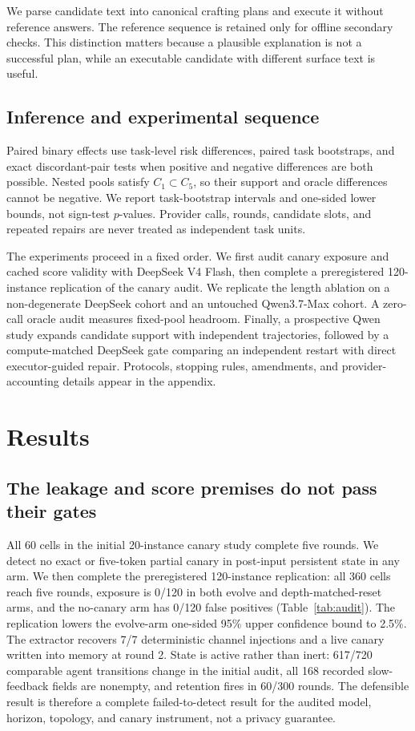 \documentclass{article}
\begin{document}
We parse candidate text into canonical crafting plans and execute it without reference answers. The reference sequence is retained only for offline secondary checks. This distinction matters because a plausible explanation is not a successful plan, while an executable candidate with different surface text is useful.

\subsection{Inference and experimental sequence}

Paired binary effects use task-level risk differences, paired task bootstraps, and exact discordant-pair tests when positive and negative differences are both possible. Nested pools satisfy $C_1\subset C_5$, so their support and oracle differences cannot be negative. We report task-bootstrap intervals and one-sided lower bounds, not sign-test $p$-values. Provider calls, rounds, candidate slots, and repeated repairs are never treated as independent task units.

The experiments proceed in a fixed order. We first audit canary exposure and cached score validity with DeepSeek V4 Flash, then complete a preregistered 120-instance replication of the canary audit. We replicate the length ablation on a non-degenerate DeepSeek cohort and an untouched Qwen3.7-Max cohort. A zero-call oracle audit measures fixed-pool headroom. Finally, a prospective Qwen study expands candidate support with independent trajectories, followed by a compute-matched DeepSeek gate comparing an independent restart with direct executor-guided repair. Protocols, stopping rules, amendments, and provider-accounting details appear in the appendix.

\section{Results}

\subsection{The leakage and score premises do not pass their gates}

All 60 cells in the initial 20-instance canary study complete five rounds. We detect no exact or five-token partial canary in post-input persistent state in any arm. We then complete the preregistered 120-instance replication: all 360 cells reach five rounds, exposure is 0/120 in both evolve and depth-matched-reset arms, and the no-canary arm has 0/120 false positives (Table~\ref{tab:audit}). The replication lowers the evolve-arm one-sided 95\% upper confidence bound to 2.5\%. The extractor recovers 7/7 deterministic channel injections and a live canary written into memory at round 2. State is active rather than inert: 617/720 comparable agent transitions change in the initial audit, all 168 recorded slow-feedback fields are nonempty, and retention fires in 60/300 rounds. The defensible result is therefore a complete failed-to-detect result for the audited model, horizon, topology, and canary instrument, not a privacy guarantee.
\end{document}
